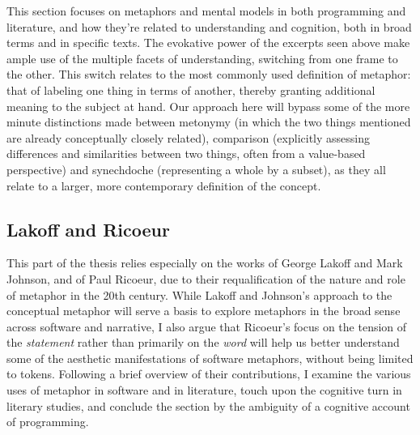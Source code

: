 \documentclass{article}
\begin{document}
This section focuses on metaphors and mental models in both programming and literature, and how they're related to understanding and cognition, both in broad terms and in specific texts. The evokative power of the excerpts seen above make ample use of the multiple facets of understanding, switching from one frame to the other. This switch relates to the most commonly used definition of metaphor: that of labeling one thing in terms of another, thereby granting additional meaning to the subject at hand. Our approach  here will bypass some of the more minute distinctions made between metonymy (in which the two things mentioned are already conceptually closely related), comparison (explicitly assessing differences and similarities between two things, often from a value-based perspective) and synechdoche (representing a whole by a subset), as they all relate to a larger, more contemporary definition of the concept.

\subsection{Lakoff and Ricoeur}

This part of the thesis relies especially on the works of George Lakoff and Mark Johnson, and of Paul Ricoeur, due to their requalification of the nature and role of metaphor in the 20th century. While Lakoff and Johnson's approach to the conceptual metaphor will serve a basis to explore metaphors in the broad sense across software and narrative, I also argue that Ricoeur's focus on the tension of the \emph{statement} rather than primarily on the \emph{word} will help us better understand some of the aesthetic manifestations of software metaphors, without being limited to tokens. Following a brief overview of their contributions, I examine the various uses of metaphor in software and in literature, touch upon the cognitive turn in literary studies, and conclude the section by the ambiguity of a cognitive account of programming.
\end{document}
